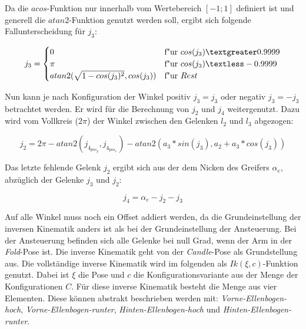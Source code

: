 Da die $acos$-Funktion nur innerhalb vom Wertebereich $[-1;1]$ definiert ist und generell die $atan2$-Funktion genutzt werden soll, ergibt sich folgende Fallunterscheidung für $j_3$:

\begin{equation}
j_3 = 
\begin{cases}
0  & \text{f"ur } cos(j_3) \textgreater 0.9999 \\
\pi & \text{f"ur } cos(j_3) \textless -0.9999 \\
atan2(\sqrt{1 - cos(j_3)^2}, cos(j_3))  & \text{f"ur } Rest
\end{cases}
\label{eq:33}
\end{equation}

Nun kann je nach Konfiguration der Winkel positiv $j_3 = j_3$ oder negativ $j_3 = -j_3$ betrachtet werden. Er wird für die Berechnung von $j_2$ und $j_4$ weitergenutzt. Dazu wird vom Vollkreis ($2\pi$) der Winkel zwischen den Gelenken $l_2$ und $l_3$ abgezogen:

\begin{equation}
j_2 = 2\pi - atan2(j_{4_{pos_y}}, j_{4_{pos_x}}) - atan2(a_3 * sin(j_3), a_2 + a_3 * cos(j_3))
\label{eq:34}
\end{equation}

Das letzte fehlende Gelenk $j_2$ ergibt sich aus der dem Nicken des Greifers $\alpha_{e}$, abzüglich der Gelenke $j_3$ und $j_2$:

\begin{equation}
j_4 =  \alpha_{e} - j_2 - j_3
\label{eq:345}
\end{equation}

Auf alle Winkel muss noch ein Offset addiert werden, da die Grundeinstellung der inversen Kinematik anders ist als bei der Grundeinstellung der Ansteuerung. Bei der Ansteuerung befinden sich alle Gelenke bei null Grad, wenn der Arm in der \textit{Fold}-Pose ist. Die inverse Kinematik geht von der \textit{Candle}-Pose als Grundstellung aus. Die vollständige inverse Kinematik wird im folgenden als $Ik(\xi, c)$-Funktion genutzt. Dabei ist $\xi$ die Pose und $c$ die Konfigurationsvariante aus der Menge der Konfigurationen $C$. Für diese inverse Kinematik besteht die Menge aus vier Elementen. Diese können abstrakt beschrieben werden mit: \textit{Vorne-Ellenbogen-hoch}, \textit{Vorne-Ellenbogen-runter}, \textit{Hinten-Ellenbogen-hoch} und \textit{Hinten-Ellenbogen-runter}.


